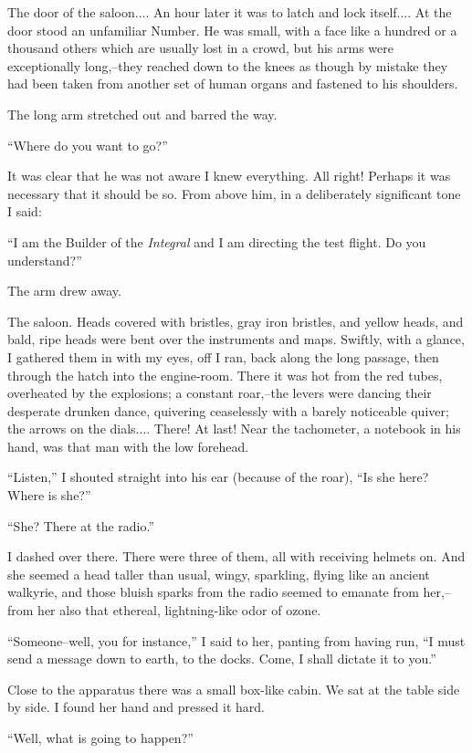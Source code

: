\documentclass[11pt,openany]{book}
\begin{document}
The door of the saloon.... An hour later it was to latch and lock itself.... At the door stood an unfamiliar Number. He was small, with a face like a hundred or a thousand others which are usually lost in a crowd, but his arms were exceptionally long,--they reached down to the knees as though by mistake they had been taken from another set of human organs and fastened to his shoulders.

The long arm stretched out and barred the way.

``Where do you want to go?''

It was clear that he was not aware I knew everything. All right! Perhaps it was necessary that it should be so. From above him, in a deliberately significant tone I said:

``I am the Builder of the \emph{Integral} and I am directing the test flight. Do you understand?''

The arm drew away.

The saloon. Heads covered with bristles, gray iron bristles, and yellow heads, and bald, ripe heads were bent over the instruments and maps. Swiftly, with a glance, I gathered them in with my eyes, off I ran, back along the long passage, then through the hatch into the engine-room. There it was hot from the red tubes, overheated by the explosions; a constant roar,--the levers were dancing their desperate drunken dance, quivering ceaselessly with a barely noticeable quiver; the arrows on the dials.... There! At last! Near the tachometer, a notebook in his hand, was that man with the low forehead.

``Listen,'' I shouted straight into his ear (because of the roar), ``Is she here? Where is she?''

``She? There at the radio.''

I dashed over there. There were three of them, all with receiving helmets on. And she seemed a head taller than usual, wingy, sparkling, flying like an ancient walkyrie, and those bluish sparks from the radio seemed to emanate from her,--from her also that ethereal, lightning-like odor of ozone.

``Someone--well, you for instance,'' I said to her, panting from having run, ``I must send a message down to earth, to the docks. Come, I shall dictate it to you.''

Close to the apparatus there was a small box-like cabin. We sat at the table side by side. I found her hand and pressed it hard.

``Well, what is going to happen?''
\end{document}
